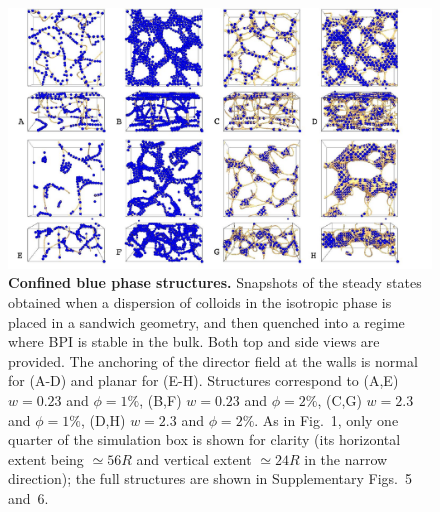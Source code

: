 \documentclass[12pt]{article}
\begin{document}
\begin{figure}
\centerline{\includegraphics[width=\textwidth]{text-fig2.jpg}}
\caption{\textbf{Confined blue phase structures.}
Snapshots of the steady states obtained when a dispersion of colloids in the isotropic phase is placed in a sandwich geometry, 
and then quenched into a regime where BPI is stable in the bulk. Both top and side views are provided.
The anchoring of the director field at the walls is normal for (A-D) and planar for (E-H). 
Structures correspond to (A,E) $w=0.23$ and $\phi=1\%$, 
(B,F) $w=0.23$ and $\phi=2\%$, 
(C,G) $w=2.3$ and $\phi=1\%$,
(D,H) $w=2.3$ and $\phi=2\%$.
As in Fig.~1, only one quarter of the simulation box is shown for clarity
(its horizontal extent being $\simeq 56R$ and vertical
extent $\simeq 24R$ in the narrow direction);
the full structures are shown in Supplementary Figs.~5 and~6.}
\end{figure}
\end{document}
